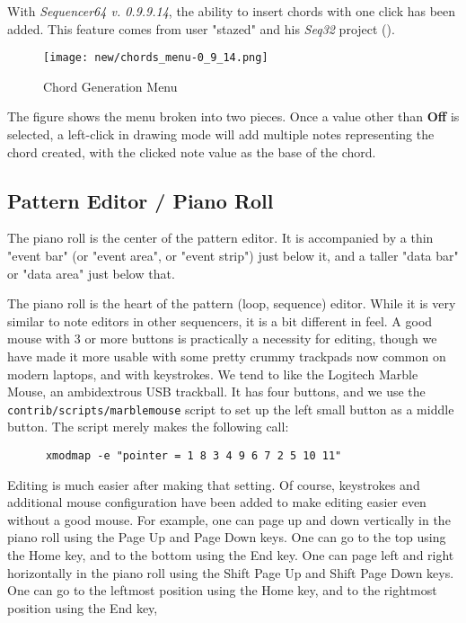    With \textsl{Sequencer64 v. 0.9.9.14}, the ability to insert chords with one
   click has been added.  This feature comes from user "stazed"
   and his \textsl{Seq32} project (\cite{seq32}).

\begin{figure}[H]
   \centering 
   \texttt{[image: new/chords\_menu-0\_9\_14.png]}
   \caption{Chord Generation Menu}
   \label{fig:pattern_editor_chords_menu}
\end{figure}

   The figure shows the menu broken into two pieces.
   Once a value other than \textbf{Off} is selected, a left-click
   in drawing mode will add multiple notes representing the chord
   created, with the clicked note value as the base of the chord.

\subsection{Pattern Editor / Piano Roll}
\label{subsec:seq64_pattern_editor_piano_roll}

   The piano roll is the center of the pattern editor.  It is accompanied by a
   thin "event bar" (or "event area", or "event strip") just below it,
   and a taller "data bar" or "data area" just below that.

   The piano roll is the heart of the pattern (loop, sequence) editor.
   While it is very similar to note editors in other sequencers, it is a bit
   different in feel.  A good mouse with 3 or more buttons is practically a
   necessity for editing, though we have made it more
   usable with some pretty crummy trackpads now common on modern laptops,
   and with keystrokes.
   We tend to like the Logitech Marble Mouse, an
   ambidextrous USB trackball.  It has four buttons, and we use the
   \texttt{contrib/scripts/marblemouse} script to set up the left small
   button as a middle button.  The script merely makes the following call:

   \begin{verbatim}
      xmodmap -e "pointer = 1 8 3 4 9 6 7 2 5 10 11"
   \end{verbatim}

   Editing is much easier after making that setting.   Of course, keystrokes
   and additional mouse configuration have been added to make editing easier
   even without a good mouse.
   For example, one can page up and down vertically in the piano roll using the
    Page Up and 
    Page Down keys.
   One can go to the top using the 
    Home key, and
   to the bottom using the
    End key.
   One can page left and right horizontally in the piano roll using the
    Shift Page Up and 
    Shift Page Down keys.
   One can go to the leftmost position using the 
    Home key,
   and to the rightmost position using the
    End key,


